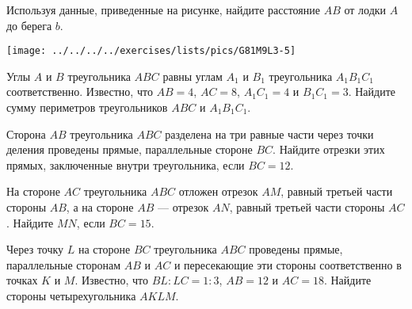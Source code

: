 \begin{class}[number=3]
\begin{listofex}
		\item 
		\begin{minipage}[t]{\bodywidth}
			Используя данные, приведенные на рисунке,
			найдите расстояние \( AB \) от лодки \( A \) до берега \( b \).
		\end{minipage}
		\hspace{0.02\linewidth}
		\begin{minipage}[t]{\picwidth}
			\texttt{[image: ../../../../exercises/lists/pics/G81M9L3-5]}
		\end{minipage}
		\item Углы \( A \)   и \( B \)   треугольника \( ABC \)   равны углам \( A_1 \)   и \(  B_1 \)   треугольника \( A_1B_1C_1 \)   соответственно. Известно, что \( AB = 4 \),   \( AC = 8 \),  \(  A_1C_1 = 4 \)   и \( B_1C_1 =3 \).   Найдите сумму периметров треугольников \(  ABC \)   и \( A_1B_1C_1 \).  
		\item Сторона \( AB \) треугольника \( ABC \) разделена на три равные части через точки деления проведены прямые, параллельные стороне \( BC \). Найдите отрезки этих прямых, заключенные внутри треугольника, если \( BC=12 \).
		\item На стороне \( AC \) треугольника \( ABC \) отложен отрезок \( AM \), равный третьей части стороны \( AB \), а на стороне \( AB \) --- отрезок \( AN \), равный третьей части стороны \( AC \). Найдите \( MN \), если \( BC=15 \).
		\item   Через точку \( L \) на стороне \( BC \) треугольника \( ABC \) проведены прямые, параллельные сторонам \( AB \) и \( AC \) и пересекающие эти стороны соответственно в точках \( K \) и \( M \). Известно, что \( BL:LC=1:3 \), \( AB=12 \) и \( AC=18 \). Найдите стороны четырехугольника \( AKLM \).
	\end{listofex}
\end{class}

